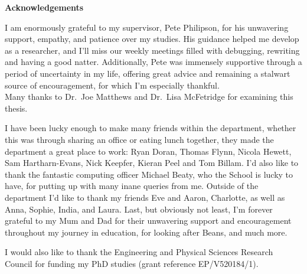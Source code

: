 \begin{center}
{\Huge \bf Acknowledgements}
\end{center}
\noindent
  I am enormously grateful to my supervisor, Pete Philipson, for his unwavering support, empathy, and patience over my studies. His guidance helped me develop as a researcher, and I'll miss our weekly meetings filled with debugging, rewriting and having a good natter. Additionally, Pete was immensely supportive through a period of uncertainty in my life, offering great advice and remaining a stalwart source of encouragement, for which I'm especially thankful.\\ Many thanks to Dr.\ Joe Matthews and Dr.\ Lisa McFetridge for examining this thesis.

  I have been lucky enough to make many friends within the department, whether this was through sharing an office or eating lunch together, they made the department a great place to work: Ryan Doran, Thomas Flynn, Nicola Hewett, Sam Hartharn-Evans, Nick Keepfer, Kieran Peel and Tom Billam. I'd also like to thank the fantastic computing officer Michael Beaty, who the School is lucky to have, for putting up with many inane queries from me.\newline
  Outside of the department I'd like to thank my friends Eve and Aaron, Charlotte, as well as Anna, Sophie, India, and Laura. Last, but obviously not least, I'm forever grateful to my Mum and Dad for their unwavering support and encouragement throughout my journey in education, for looking after Beans, and much more.

  I would also like to thank the Engineering and Physical Sciences Research Council for funding my PhD studies (grant reference EP/V520184/1).
    
\thispagestyle{empty}
\restoregeometry